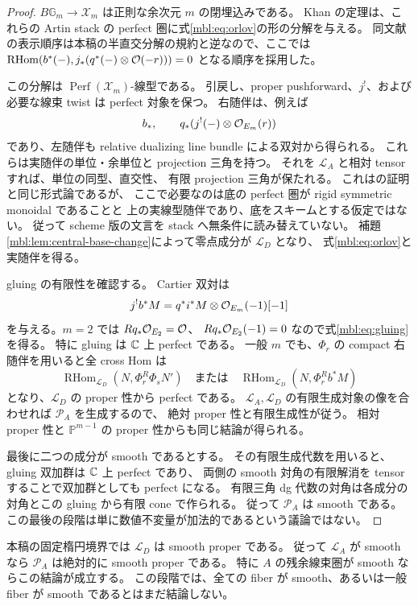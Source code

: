 \begin{proof}
$B\mathbb G_m\to\mathscr X_m$ は正則な余次元 $m$ の閉埋込みである。
Khan の定理\cite[Theorem~C]{CMOKhanBlowups}は、これらの Artin stack の
perfect 圏に式\eqref{mbl:eq:orlov}の形の分解を与える。
同文献の表示順序は本稿の半直交分解の規約と逆なので、ここでは
$\operatorname{RHom}(b^*(-),j_*(q^*(-)\otimes\mathcal O(-r)))=0$
となる順序を採用した。

この分解は $\operatorname{Perf}(\mathscr X_m)$-線型である。
引戻し、proper pushforward、$j^!$、および必要な線束 twist は perfect 対象を保つ。
右随伴は、例えば
\[
 b_*,\qquad q_*(j^!(-)\otimes\mathcal O_{E_m}(r))
\]
であり、左随伴も relative dualizing line bundle による双対から得られる。
これらは実随伴の単位・余単位と projection 三角を持つ。
それを $\mathcal L_A$ と相対 tensor すれば、単位の同型、直交性、
有限 projection 三角が保たれる。
これは\cite[Lemma~3.15]{CRSPerry}の証明と同じ形式論であるが、
ここで必要なのは底の perfect 圏が rigid symmetric monoidal であることと
上の実線型随伴であり、底をスキームとする仮定ではない。
従って scheme 版の文言を stack へ無条件に読み替えていない。
補題\ref{mbl:lem:central-base-change}によって零点成分が $\mathcal L_D$ となり、
式\eqref{mbl:eq:orlov}と実随伴を得る。

gluing の有限性を確認する。
Cartier 双対\cite[Proposition~4.2]{CMOKhanBlowups}は
\[
 j^!b^*M=q^*i^*M\otimes\mathcal O_{E_m}(-1)[-1]
\]
を与える。$m=2$ では $Rq_*\mathcal O_{E_2}=\mathcal O$、
$Rq_*\mathcal O_{E_2}(-1)=0$ なので式\eqref{mbl:eq:gluing}を得る。
特に gluing は $\mathbb C$ 上 perfect である。
一般 $m$ でも、$\Phi_r$ の compact 右随伴を用いると全 cross Hom は
\[
 \operatorname{RHom}_{\mathcal L_D}(N,\Phi_r^R\Phi_sN')
 \quad\text{または}\quad
 \operatorname{RHom}_{\mathcal L_D}(N,\Phi_r^Rb^*M)
\]
となり、$\mathcal L_D$ の proper 性から perfect である。
$\mathcal L_A,\mathcal L_D$ の有限生成対象の像を合わせれば $\mathcal P_A$ を生成するので、
絶対 proper 性と有限生成性が従う。
相対 proper 性と $\mathbb P^{m-1}$ の proper 性からも同じ結論が得られる。

最後に二つの成分が smooth であるとする。
その有限生成代数を用いると、gluing 双加群は $\mathbb C$ 上 perfect であり、
両側の smooth 対角の有限解消を tensor することで双加群としても perfect になる。
有限三角 dg 代数の対角は各成分の対角とこの gluing から有限 cone で作られる。
従って $\mathcal P_A$ は smooth である。
この最後の段階は単に数値不変量が加法的であるという議論ではない。
\end{proof}

\begin{corollary}
\label{mbl:cor:smooth-source}
本稿の固定楕円境界では $\mathcal L_D$ は smooth proper である。
従って $\mathcal L_A$ が smooth なら $\mathcal P_A$ は絶対的に smooth proper である。
特に $A$ の残余線束圏が smooth ならこの結論が成立する。
この段階では、全ての fiber が smooth、あるいは一般 fiber が smooth であるとはまだ結論しない。
\end{corollary}


